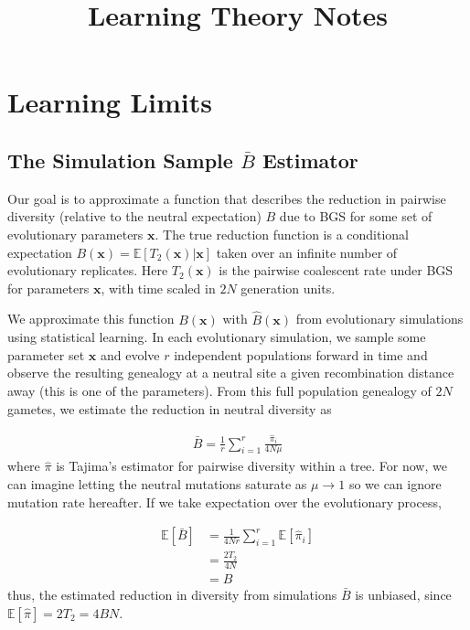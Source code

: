 \documentclass[11pt]{article}
\title{Learning Theory Notes}
\newcommand{\E}{\mathbb{E}}
\begin{document}
\maketitle

\section*{Learning Limits}

\subsection*{The Simulation Sample $\bar{B}$ Estimator}

Our goal is to approximate a function that describes the reduction in pairwise
diversity (relative to the neutral expectation) $B$ due to BGS for some set of
evolutionary parameters $\mathbf{x}$. The true reduction function is a
conditional expectation $B(\mathbf{x}) = \E[T_2(\mathbf{x}) | \mathbf{x}]$
taken over an infinite number of evolutionary replicates. Here
$T_2(\mathbf{x})$ is the pairwise coalescent rate under BGS for parameters
$\mathbf{x}$, with time scaled in $2N$ generation units.

We approximate this function $B(\mathbf{x})$ with $\widehat{B}(\mathbf{x})$
from evolutionary simulations using statistical learning. In each evolutionary
simulation, we sample some parameter set $\mathbf{x}$ and evolve $r$
independent populations forward in time and observe the resulting genealogy at
a neutral site a given recombination distance away (this is one of the
parameters). From this full population genealogy of $2N$ gametes, we estimate
the reduction in neutral diversity as

\begin{align}
  \bar{B} = \frac{1}{r} \sum_{i=1}^r \frac{\hat{\pi}_{i}}{4N\mu}
\end{align}
%
where $\hat{\pi}$ is Tajima's estimator for pairwise diversity within a tree.
For now, we can imagine letting the neutral mutations saturate as $\mu \to 1$
so we can ignore mutation rate hereafter. If we take expectation over the evolutionary
process,

\begin{align}
  \E[\bar{B}] &= \frac{1}{4Nr} \sum_{i=1}^r \E[\hat{\pi}_{i}] \\
                          &= \frac{2T_2}{4N}  \\
                          &= B
\end{align}
%
thus, the estimated reduction in diversity from simulations $\bar{B}$ is
unbiased, since $\E[\hat{\pi}] = 2T_2 = 4BN$.
\end{document}
